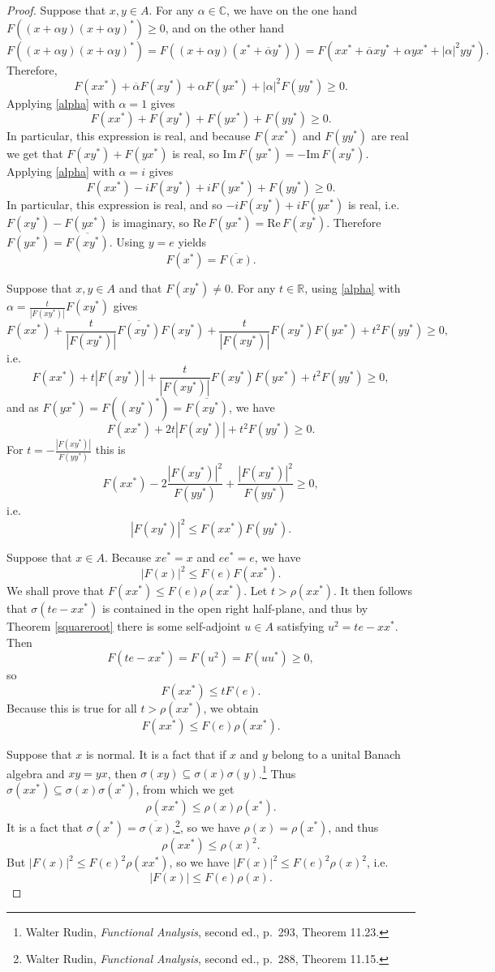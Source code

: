 \documentclass{article}
\def\Re{\ensuremath{\mathrm{Re}}\,}
\def\Im{\ensuremath{\mathrm{Im}}\,}
\theoremstyle{definition}
\begin{document}
\begin{proof}
Suppose that $x,y \in A$.
For any $\alpha \in \mathbb{C}$, we have on the one hand $F((x+\alpha y)(x+\alpha y)^*) \geq 0$, and on the other hand
\[
F((x+\alpha y)(x+\alpha y)^*) = F((x+\alpha y)(x^*+\overline{\alpha}y^*))  = 
F(xx^*+\overline{\alpha}xy^*+\alpha yx^*+|\alpha|^2 yy^*).
\]
Therefore,
\begin{equation}
F(xx^*) + \overline{\alpha}F(xy^*)+\alpha F(yx^*)+|\alpha|^2 F(yy^*) \geq 0.
\label{alpha}
\end{equation}
Applying \eqref{alpha} with $\alpha=1$ gives
\[
F(xx^*) + F(xy^*)+F(yx^*)+F(yy^*) \geq 0.
\]
In particular, this expression is real, and because $F(xx^*)$ and $F(yy^*)$ are real we get that
$F(xy^*)+F(yx^*)$ is real, so $\Im F(yx^*)=-\Im F(xy^*)$.
Applying \eqref{alpha} with $\alpha=i$ gives
\[
F(xx^*) -iF(xy^*)+iF(yx^*)+F(yy^*) \geq 0.
\]
In particular, this expression is real, and so $-iF(xy^*)+iF(yx^*)$ is real, i.e. $F(xy^*)-F(yx^*)$ is imaginary, so $\Re F(yx^*)=\Re F(xy^*)$. Therefore
$F(yx^*)=\overline{F(xy^*)}$. Using $y=e$ yields
\[
F(x^*)=\overline{F(x)}.
\]

Suppose that $x,y \in A$ and that $F(xy^*) \neq 0$. For any $t \in \mathbb{R}$, using \eqref{alpha} with $\alpha = \frac{t}{|F(xy^*)|} F(xy^*)$ gives
\[
F(xx^*) +  \frac{t}{|F(xy^*)|}  \overline{F(xy^*)} F(xy^*) +  \frac{t}{|F(xy^*)|} F(xy^*) F(yx^*)+ t^2 F(yy^*) \geq 0,
\]
i.e.
\[
F(xx^*) + t |F(xy^*)| +   \frac{t}{|F(xy^*)|} F(xy^*) F(yx^*) + t^2 F(yy^*) \geq 0,
\]
and as $F(yx^*)=F((xy^*)^*) = \overline{F(xy^*)}$, we have
\[
F(xx^*)+2t|F(xy^*)| + t^2F(yy^*) \geq 0.
\]
For $t=-\frac{|F(xy^*)|}{F(yy^*)}$ this is
\[
F(xx^*)-2\frac{|F(xy^*)|^2}{F(yy^*)} + \frac{|F(xy^*)|^2}{F(yy^*)} \geq 0,
\]
i.e.
\[
|F(xy^*)|^2 \leq F(xx^*)F(yy^*).
\]

Suppose that $x \in A$. Because $xe^*=x$ and $ee^*=e$, we have 
\[
|F(x)|^2 \leq F(e)F(xx^*).
\]
We shall prove that $F(xx^*) \leq F(e) \rho(xx^*)$.
Let $t>\rho(xx^*)$. It then follows  that $\sigma(te-xx^*)$ is contained in the open right 
half-plane, and thus by Theorem \ref{squareroot} there is some self-adjoint $u \in A$ satisfying $u^2=te-xx^*$. Then
\[
F(te-xx^*) = F(u^2) = F(uu^*) \geq 0,
\]
so
\[
F(xx^*) \leq t F(e).
\]
Because this is true for all $t>\rho(xx^*)$, we obtain
\[
F(xx^*) \leq F(e) \rho(xx^*).
\]

Suppose that $x$ is normal. It is a fact that if $x$ and $y$ belong to a unital Banach algebra and $xy=yx$, then $\sigma(xy)
\subseteq \sigma(x)\sigma(y)$.\footnote{Walter Rudin, {\em Functional Analysis}, second ed., p.~293, Theorem 11.23.}
Thus $\sigma(xx^*) \subseteq \sigma(x)\sigma(x^*)$, from which we get 
\[
\rho(xx^*) \leq \rho(x) \rho(x^*).
\]
It is a fact that $\sigma(x^*)=\overline{\sigma(x)}$,\footnote{Walter Rudin, {\em Functional Analysis}, second ed.,
p.~288, Theorem 11.15.}, so we have $\rho(x)=\rho(x^*)$, and thus
\[
\rho(xx^*) \leq \rho(x)^2.
\]
But $|F(x)|^2 \leq F(e)^2 \rho(xx^*)$, so we have $|F(x)|^2 \leq F(e)^2 \rho(x)^2$, i.e.
\[
|F(x)| \leq F(e) \rho(x).
\] 


\end{proof}
\end{document}

